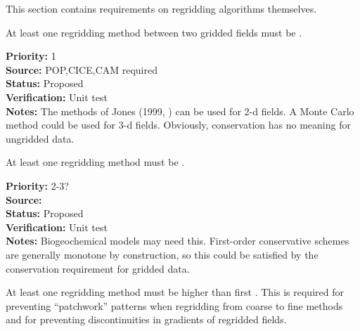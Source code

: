 
This section contains requirements on regridding algorithms themselves.


At least one regridding method between two gridded fields must be
.

\begin{reqlist}
{\bf Priority:} 1 \\
{\bf Source:} POP,CICE,CAM required \\
{\bf Status:} Proposed \\
{\bf Verification:} Unit test \\
{\bf Notes:} The methods of Jones (1999, \cite{Jones1999}) can be used
             for 2-d fields. A Monte Carlo method could be used for
             3-d fields.  Obviously, conservation has no meaning
             for ungridded data.
\end{reqlist}


At least one regridding method must be .

\begin{reqlist}
{\bf Priority:} 2-3? \\
{\bf Source:}  \\
{\bf Status:} Proposed \\
{\bf Verification:} Unit test \\
{\bf Notes:} Biogeochemical models may need this.  First-order
             conservative schemes are generally monotone by
             construction, so this could be satisfied by the
             conservation requirement for gridded data.
\end{reqlist}



At least one regridding method must be higher than first
.  This is required for preventing
``patchwork'' patterns when regridding from coarse to fine
methods and for preventing discontinuities in gradients of
regridded fields.

